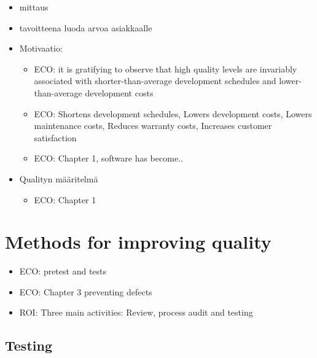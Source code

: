 ﻿\documentclass[12pt,a4paper,finnish]{tutthesis}
\begin{document}
 \begin{itemize}
 
 \item mittaus
 
 \item tavoitteena luoda arvoa asiakkaalle
 
 \item Motivaatio:
 
 \begin{itemize}
 
 \item ECO: it is gratifying to observe that high quality levels are invariably associated with shorter-than-average development schedules and lower-than-average development costs
 \item ECO: Shortens development schedules, Lowers development costs, Lowers maintenance costs, Reduces warranty costs, Increases customer satisfaction
 \item ECO: Chapter 1, software has become..
 
 \end{itemize}
 
 \item Qualityn määritelmä




 \begin{itemize}
 
 \item ECO: Chapter 1
 
 \end{itemize}
 
 \end{itemize}
 
 \section{Methods for improving quality}
 
 \begin{itemize}
 
 \item ECO: pretest and tests
 
 \item ECO: Chapter 3 preventing defects 
 
 \item ROI: Three main activities: Review, process audit and testing
 
 \end{itemize}
 
 \subsection{Testing}
 
\end{document}
